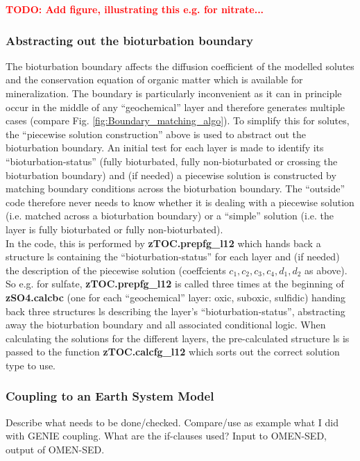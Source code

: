 \documentclass[gmd, manuscript]{copernicus}
\begin{document}
\textbf{\textcolor{red}{TODO: Add figure, illustrating this e.g. for nitrate...}}%

\subsubsection*{Abstracting out the bioturbation boundary}
The bioturbation boundary affects the diffusion coefficient of the modelled solutes and the conservation equation of organic matter which is available for mineralization. 
The boundary is particularly inconvenient as it can in principle occur in the middle of any ``geochemical'' layer and therefore generates multiple cases (compare Fig. \ref{fig:Boundary_matching_algo}). 
To simplify this for solutes, the ``piecewise solution construction'' above is used to abstract out the bioturbation boundary. 
An initial test for each layer is made to identify its ``bioturbation-status'' (fully bioturbated, fully non-bioturbated or crossing the bioturbation boundary) and (if needed) a piecewise solution is 
constructed by matching boundary conditions across the bioturbation boundary. 
The ``outside'' code therefore never needs to know whether it is dealing with a piecewise solution (i.e. matched across a bioturbation boundary) or a ``simple'' solution (i.e. the layer is fully bioturbated
or fully non-bioturbated).\\[1em]
In the code, this is performed by \textsf{\textbf{zTOC.prepfg\_l12}} which hands back a structure \textsf{ls} containing the ``bioturbation-status'' for each layer and (if needed) 
the description of the piecewise solution (coeffcients $c_1, c_2, c_3, c_4, d_1, d_2$ as above). So e.g. for sulfate, \textsf{\textbf{zTOC.prepfg\_l12}} is called three times at the beginning of \textsf{\textbf{zSO4.calcbc}} 
(one for each ``geochemical'' layer: oxic, suboxic, sulfidic) handing back three structures \textsf{ls} describing the layer's ``bioturbation-status'', abstracting away the bioturbation boundary and all associated conditional logic. 
When calculating the solutions for the different layers, the pre-calculated structure \textsf{ls} is passed to the function \textsf{\textbf{zTOC.calcfg\_l12}} which sorts out the correct
solution type to use.

\subsubsection{Coupling to an Earth System Model}\label{subsubsec:ESM_coupling}
Describe what needs to be done/checked. Compare/use as example what I did with GENIE coupling. What are the if-clauses used? Input to OMEN-SED, output of OMEN-SED. 
\end{document}
